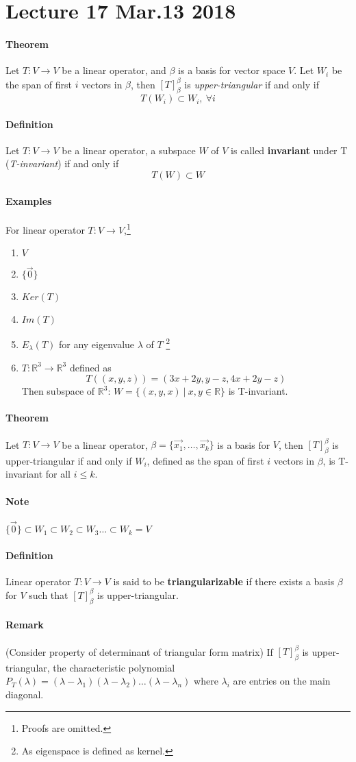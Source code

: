 \documentclass[11pt]{article}
\newcommand{\trans}[3]{{#1}: {#2} \to {#3}}
\newcommand{\R}[0]{\mathbb{R}}
\newcommand{\tmat}[3]{[{#1}]_{{#2}}^{{#3}}}
\newcommand{\vset}[3]{\{\vec{{#1}_{#2}}, \dots, \vec{{#1}_{#3}}\}}
\newcommand{\definition}[0]{\paragraph{Definition}}
\newcommand{\theorem}[0]{\paragraph{Theorem}}
\begin{document}
	
	\section{Lecture 17 Mar.13 2018}
	\theorem Let $\trans{T}{V}{V}$ be a linear operator, and $\beta$ is a basis for vector space $V$. Let $W_i$ be the span of first $i$ vectors in $\beta$, then $\tmat{T}{\beta}{\beta}$ is \emph{upper-triangular} if and only if 
	\[
		T(W_i) \subset W_i,\ \forall i 
	\]
	\definition Let $\trans{T}{V}{V}$ be a linear operator, a subspace $W$ of $V$ is called \textbf{invariant} under T (\emph{T-invariant}) if and only if 
	\[
	T(W) \subset W
	\]
	\paragraph{Examples} For linear operator $\trans{T}{V}{V}$,\footnote{Proofs are omitted.}
	\begin{enumerate}
		\item $V$
		\item $\{\vec{0}\}$
		\item $Ker(T)$
		\item $Im(T)$
		\item $E_{\lambda}(T)$ for any eigenvalue $\lambda$ of $T$ \footnote{As eigenspace is defined as kernel.}
		\item $\trans{T}{\R^3}{\R^3}$ defined as 
		\[
			T((x,y,z)) = (3x+2y, y-z, 4x+2y-z)
		\] Then subspace of $\R^3$: $W = \{(x,y,x)\ \vert\ x,y \in \R\}$ is T-invariant.
	\end{enumerate}
	\theorem Let $\trans{T}{V}{V}$ be a linear operator, $\beta=\vset{x}{1}{k}$ is a basis for $V$, then $\tmat{T}{\beta}{\beta}$ is upper-triangular if and only if $W_i$, defined as the span of first $i$ vectors in $\beta$, is T-invariant for all $i \leq k$.
	\paragraph{Note} $\{\vec{0}\}\subset W_1 \subset W_2 \subset W_3 \dots \subset W_k = V$
	\definition Linear operator $\trans{T}{V}{V}$ is said to be \textbf{triangularizable} if there  exists a basis $\beta$ for $V$ such that $\tmat{T}{\beta}{\beta}$ is upper-triangular.
	\paragraph{Remark} (Consider property of determinant of triangular form matrix) If $\tmat{T}{\beta}{\beta}$ is upper-triangular, the characteristic polynomial $P_T(\lambda) = (\lambda - \lambda_1)(\lambda - \lambda_2)\dots(\lambda - \lambda_n)$ where $\lambda_i$ are entries on the main diagonal.
\end{document}
